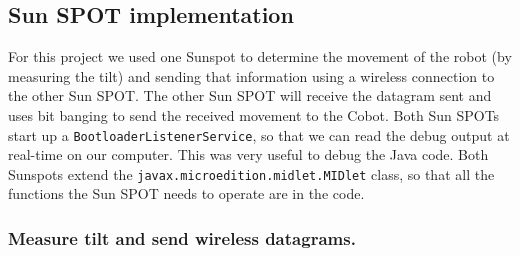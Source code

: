 \documentclass[a4paper,10pt]{article} %
\begin{document}

\subsection{Sun SPOT implementation} %
\label{sub:Sun SPOT implementation}

For this project we used one Sunspot to determine the movement of the robot (by
measuring the tilt) and sending that information using a wireless connection to
the other Sun SPOT. The other Sun SPOT will receive the datagram sent and uses
bit banging to send the received movement to the Cobot. Both Sun SPOTs start up
a \texttt{BootloaderListenerService}, so that we can read the debug output at
real-time on our computer. This was very useful to debug the Java code. Both
Sunspots extend the \texttt{javax.microedition.midlet.MIDlet} class, so that all
the functions the Sun SPOT needs to operate are in the code.

\subsubsection{Measure tilt and send wireless datagrams.} %
\end{document}
